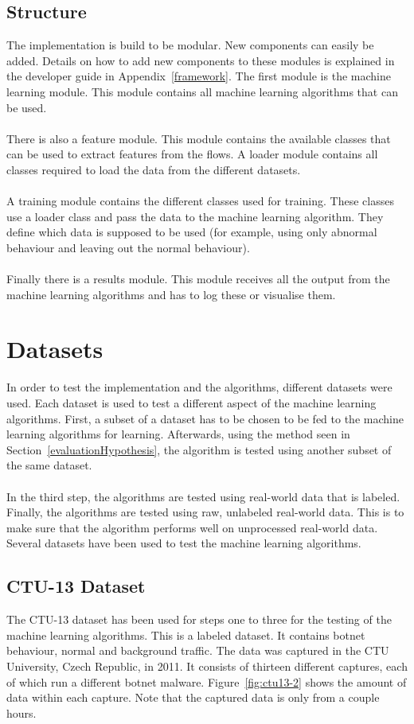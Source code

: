 \subsection{Structure}
\label{modules}
The implementation is build to be modular. New components can easily be added. Details on how to add new components to these modules is explained in the developer guide in Appendix~\ref{framework}. The first module is the machine learning module. This module contains all machine learning algorithms that can be used. \\
\\
There is also a feature module. This module contains the available classes that can be used to extract features from the flows. A loader module contains all classes required to load the data from the different datasets. \\
\\
A training module contains the different classes used for training. These classes use a loader class and pass the data to the machine learning algorithm. They define which data is supposed to be used (for example, using only abnormal behaviour and leaving out the normal behaviour). \\
\\
Finally there is a results module. This module receives all the output from the machine learning algorithms and has to log these or visualise them.

\section{Datasets}
In order to test the implementation and the algorithms, different datasets were used. Each dataset is used to test a different aspect of the machine learning algorithms. First, a subset of a dataset has to be chosen to be fed to the machine learning algorithms for learning. Afterwards, using the method seen in Section~\ref{evaluationHypothesis}, the algorithm is tested using another subset of the same dataset. \\\\
In the third step, the algorithms are tested using real-world data that is labeled. Finally, the algorithms are tested using raw, unlabeled real-world data. This is to make sure that the algorithm performs well on unprocessed real-world data. Several datasets have been used to test the machine learning algorithms.

\subsection{CTU-13 Dataset}
The CTU-13 dataset has been used for steps one to three for the testing of the machine learning algorithms. This is a labeled dataset. It contains botnet behaviour, normal and background traffic. The data was captured in the CTU University, Czech Republic, in 2011. It consists of thirteen different captures, each of which run a different botnet malware. Figure~\ref{fig:ctu13-2} shows the amount of data within each capture. Note that the captured data is only from a couple hours.  \cite{garcia2014empirical} 

